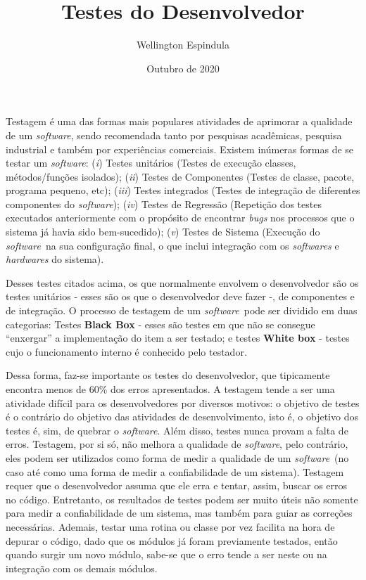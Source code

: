 \documentclass[12pt, a4paper]{article}
\title{Testes do Desenvolvedor}
\author{Wellington Espindula}
\date{Outubro de 2020}
\newcommand{\tit}[1]{\textit{#1}}
\newcommand{\tb}[1]{\textbf{#1}}
\newcommand{\iitem}[1]{(\tit{#1})}
\newcommand{\sw}{\tit{software}}
\newcommand{\quotes}[1]{``#1''}
\begin{document}
    \maketitle
    
    Testagem é uma das formas mais populares atividades de aprimorar a qualidade de um \sw, sendo recomendada tanto por pesquisas acadêmicas, pesquisa industrial e também por experiências comerciais. Existem inúmeras formas de se testar um \sw: \iitem{i} Testes unitários (Testes de execução classes, métodos/funções isolados); \iitem{ii} Testes de Componentes (Testes de classe, pacote, programa pequeno, etc); \iitem{iii} Testes integrados (Testes de integração de diferentes componentes do \sw); \iitem{iv} Testes de Regressão (Repetição dos testes executados anteriormente com o propósito de encontrar \tit{bugs} nos processos que o sistema já havia sido bem-sucedido); \iitem{v} Testes de Sistema (Execução do \sw \ na sua configuração final, o que inclui integração com os \tit{softwares} e \tit{hardwares} do sistema).
    
    Desses testes citados acima, os que normalmente envolvem o desenvolvedor são os testes unitários - esses são os que o desenvolvedor deve fazer -, de componentes e de integração. O processo de testagem de um \sw \ pode ser dividido em duas categorias: Testes \tb{Black Box} - esses são testes em que não se consegue \quotes{enxergar} a implementação do item a ser testado; e testes \tb{White box} - testes cujo o funcionamento interno é conhecido pelo testador.
    
   Dessa forma, faz-se importante os testes do desenvolvedor, que tipicamente encontra menos de 60\% dos erros apresentados. A testagem tende a ser uma atividade difícil para os desenvolvedores por diversos motivos: o objetivo de testes é o contrário do objetivo das atividades de desenvolvimento, isto é, o objetivo dos testes é, sim, de quebrar o \sw. Além disso, testes nunca provam a falta de erros. Testagem, por si só, não melhora a qualidade de \sw, pelo contrário, eles podem ser utilizados como forma de medir a qualidade de um \sw \ (no caso até como uma forma de medir a confiabilidade de um sistema). Testagem requer que o desenvolvedor assuma que ele erra e tentar, assim, buscar os erros no código. Entretanto, os resultados de testes podem ser muito úteis não somente para medir a confiabilidade de um sistema, mas também para guiar as correções necessárias. Ademais, testar uma rotina ou classe por vez facilita na hora de depurar o código, dado que os módulos já foram previamente testados, então quando surgir um novo módulo, sabe-se que o erro tende a ser neste ou na integração com os demais módulos.
   
\end{document}
